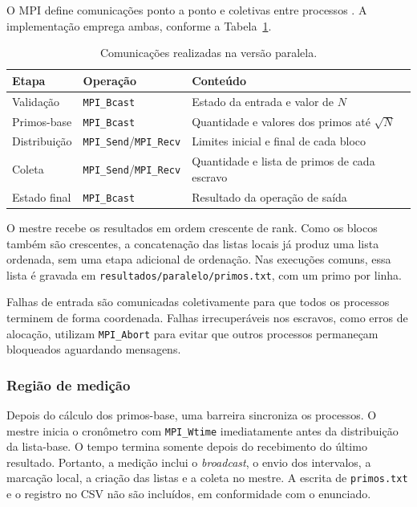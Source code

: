 \documentclass[12pt,a4paper]{article}
\begin{document}
O MPI define comunicações ponto a ponto e coletivas entre processos
\cite{mpi41}. A implementação emprega ambas, conforme a
Tabela~\ref{tab:comunicacoes}.

\begin{table}[ht]
    \centering
    \caption{Comunicações realizadas na versão paralela.}
    \label{tab:comunicacoes}
    \begin{tabular}{p{}p{}p{}}
        \toprule
        \textbf{Etapa} & \textbf{Operação} & \textbf{Conteúdo} \\
        \midrule
        Validação & \texttt{MPI\_Bcast} & Estado da entrada e valor de $N$ \\
        Primos-base & \texttt{MPI\_Bcast} & Quantidade e valores dos primos até $\sqrt{N}$ \\
        Distribuição & \texttt{MPI\_Send}/\texttt{MPI\_Recv} & Limites inicial e final de cada bloco \\
        Coleta & \texttt{MPI\_Send}/\texttt{MPI\_Recv} & Quantidade e lista de primos de cada escravo \\
        Estado final & \texttt{MPI\_Bcast} & Resultado da operação de saída \\
        \bottomrule
    \end{tabular}
\end{table}

O mestre recebe os resultados em ordem crescente de rank. Como os blocos
também são crescentes, a concatenação das listas locais já produz uma lista
ordenada, sem uma etapa adicional de ordenação. Nas execuções comuns, essa
lista é gravada em \texttt{resultados/paralelo/primos.txt}, com um primo por
linha.

Falhas de entrada são comunicadas coletivamente para que todos os processos
terminem de forma coordenada. Falhas irrecuperáveis nos escravos, como erros
de alocação, utilizam \texttt{MPI\_Abort} para evitar que outros processos
permaneçam bloqueados aguardando mensagens.

\subsubsection{Região de medição}

Depois do cálculo dos primos-base, uma barreira sincroniza os processos. O
mestre inicia o cronômetro com \texttt{MPI\_Wtime} imediatamente antes da
distribuição da lista-base. O tempo termina somente depois do recebimento do
último resultado. Portanto, a medição inclui o \textit{broadcast}, o envio dos
intervalos, a marcação local, a criação das listas e a coleta no mestre. A
escrita de \texttt{primos.txt} e o registro no CSV não são incluídos, em
conformidade com o enunciado.
\end{document}
